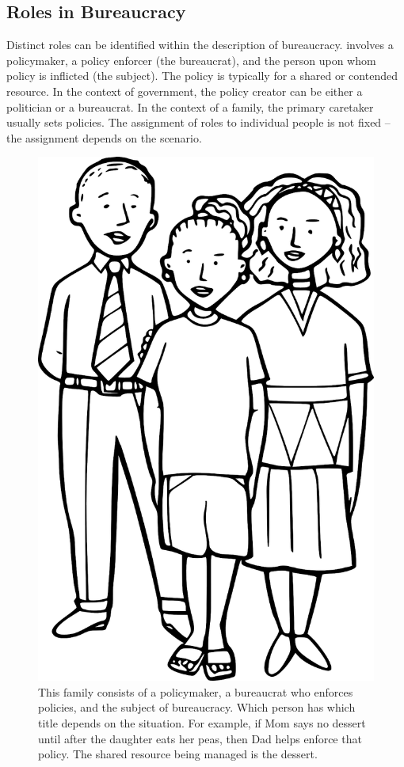 \subsection*{Roles in Bureaucracy}

Distinct roles can be identified within the description of bureaucracy.
\iftoggle{glossarysubstitutionworks}{\Gls{core bureaucracy}}{Bureaucracy} involves 
a \gls{policymaker}, 
a policy enforcer (the bureaucrat), and the person upon whom policy is inflicted 
(the \gls{subject}). 
The policy is typically for a shared or contended resource. In the context of government, the policy creator can be either a politician or a bureaucrat. In the context of a family, the primary caretaker usually sets policies. The assignment of roles to individual people is not fixed -- the assignment depends on the scenario. 

\begin{figure}
    \centering
    \includegraphics[width=.8\textwidth]{images/family-father-mother-daughter-28725_1280_pixabay.png}
    \caption{This family consists of a policymaker, a bureaucrat who enforces policies, and the subject of bureaucracy. Which person has which title depends on the situation. For example, if Mom says no dessert until after the daughter eats her peas, then Dad helps enforce that policy. The shared resource being managed is the dessert. }
    \label{fig:family-of-bureaucrats}
\end{figure}

